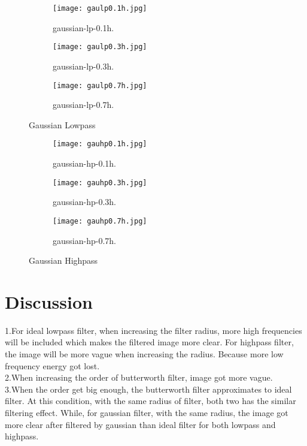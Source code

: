 \documentclass[14pt]{article}
\begin{document}
	\begin{figure}[hbt!]
		\centering
		
				\begin{subfigure}[b]{0.3\linewidth}
					\texttt{[image: gaulp0.1h.jpg]}
					\caption{gaussian-lp-0.1h.}
				\end{subfigure}
				\begin{subfigure}[b]{0.3\linewidth}
					\texttt{[image: gaulp0.3h.jpg]}
					\caption{gaussian-lp-0.3h.}
				\end{subfigure}
					\begin{subfigure}[b]{0.3\linewidth}
						\texttt{[image: gaulp0.7h.jpg]}
						\caption{gaussian-lp-0.7h.}
				\end{subfigure}
						\caption{Gaussian Lowpass}
	\end{figure}

\begin{figure}[hbt!]
	\centering
	
	\begin{subfigure}[b]{0.3\linewidth}
		\texttt{[image: gauhp0.1h.jpg]}
		\caption{gaussian-hp-0.1h.}
	\end{subfigure}
	\begin{subfigure}[b]{0.3\linewidth}
		\texttt{[image: gauhp0.3h.jpg]}
		\caption{gaussian-hp-0.3h.}
	\end{subfigure}
	\begin{subfigure}[b]{0.3\linewidth}
		\texttt{[image: gauhp0.7h.jpg]}
		\caption{gaussian-hp-0.7h.}
	\end{subfigure}
	\caption{Gaussian Highpass}
\end{figure}

		
	\section{Discussion}
1.For ideal lowpass filter, when increasing the filter radius, more high frequencies will be included which makes the filtered image more clear. For highpass filter, the image will be more vague when increasing the radius. Because more low frequency energy got lost.\\
2.When increasing the order of butterworth filter, image got more vague.\\
3.When the order get big enough, the butterworth filter approximates to ideal filter. At this condition, with the same radius of filter, both two has the similar filtering effect. While, for gaussian filter, with the same radius, the image got more clear after filtered by gaussian than ideal filter for both lowpass and highpass.
\end{document}
